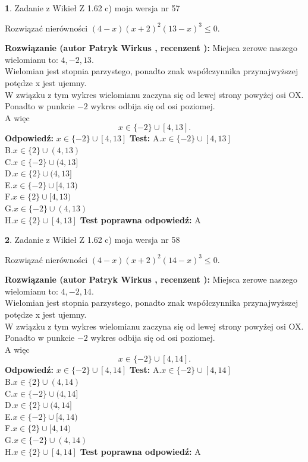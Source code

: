 \documentclass[12pt, a4paper]{article}
\theoremstyle{definition} %
\newtheorem{zad}{}
\newcommand{\zadStart}[1]{\begin{zad}#1\newline}
\newcommand{\zadStop}{\end{zad}}
\newcommand{\rozwStart}[2]{\noindent \textbf{Rozwiązanie (autor #1 , recenzent #2): }\newline}
\newcommand{\rozwStop}{\newline}
\newcommand{\odpStart}{\noindent \textbf{Odpowiedź:}\newline}
\newcommand{\odpStop}{\newline}
\newcommand{\testStart}{\noindent \textbf{Test:}\newline}
\newcommand{\testStop}{\newline}
\newcommand{\kluczStart}{\noindent \textbf{Test poprawna odpowiedź:}\newline}
\newcommand{\kluczStop}{\newline}
\begin{document}
\zadStart{Zadanie z Wikieł Z 1.62 c) moja wersja nr 57}

Rozwiązać nierówności $(4-x)(x+2)^{2}(13-x)^{3}\le0$.
\zadStop
\rozwStart{Patryk Wirkus}{}
Miejsca zerowe naszego wielomianu to: $4, -2, 13$.\\
Wielomian jest stopnia parzystego, ponadto znak współczynnika przy\linebreak najwyższej potędze x jest ujemny.\\ W związku z tym wykres wielomianu zaczyna się od lewej strony powyżej osi OX.\\
Ponadto w punkcie $-2$ wykres odbija się od osi poziomej.\\
A więc $$x \in \{-2\} \cup [4,13].$$
\rozwStop
\odpStart
$x \in \{-2\} \cup [4,13]$
\odpStop
\testStart
A.$x \in \{-2\} \cup [4,13]$\\
B.$x \in \{2\} \cup (4,13)$\\
C.$x \in \{-2\} \cup (4,13]$\\
D.$x \in \{2\} \cup (4,13]$\\
E.$x \in \{-2\} \cup [4,13)$\\
F.$x \in \{2\} \cup [4,13)$\\
G.$x \in \{-2\} \cup (4,13)$\\
H.$x \in \{2\} \cup [4,13]$
\testStop
\kluczStart
A
\kluczStop



\zadStart{Zadanie z Wikieł Z 1.62 c) moja wersja nr 58}

Rozwiązać nierówności $(4-x)(x+2)^{2}(14-x)^{3}\le0$.
\zadStop
\rozwStart{Patryk Wirkus}{}
Miejsca zerowe naszego wielomianu to: $4, -2, 14$.\\
Wielomian jest stopnia parzystego, ponadto znak współczynnika przy\linebreak najwyższej potędze x jest ujemny.\\ W związku z tym wykres wielomianu zaczyna się od lewej strony powyżej osi OX.\\
Ponadto w punkcie $-2$ wykres odbija się od osi poziomej.\\
A więc $$x \in \{-2\} \cup [4,14].$$
\rozwStop
\odpStart
$x \in \{-2\} \cup [4,14]$
\odpStop
\testStart
A.$x \in \{-2\} \cup [4,14]$\\
B.$x \in \{2\} \cup (4,14)$\\
C.$x \in \{-2\} \cup (4,14]$\\
D.$x \in \{2\} \cup (4,14]$\\
E.$x \in \{-2\} \cup [4,14)$\\
F.$x \in \{2\} \cup [4,14)$\\
G.$x \in \{-2\} \cup (4,14)$\\
H.$x \in \{2\} \cup [4,14]$
\testStop
\kluczStart
A
\kluczStop
\end{document}
